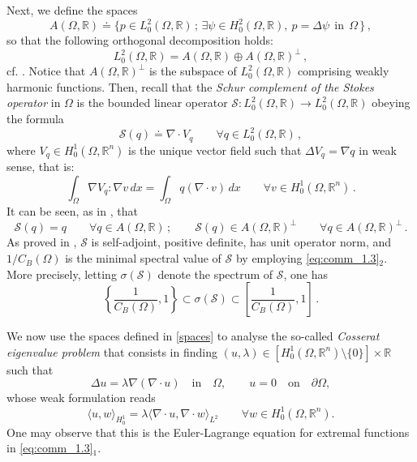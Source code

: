 \documentclass[11pt]{article}
\theoremstyle{plain}
\theoremstyle{definition}
\numberwithin{equation}{section}
\newcommand{\R}{\mathbb{R}}
\begin{document}
Next, we define the spaces
$$
A(\Omega,\R) \doteq \{ p \in L_{0}^{2}(\Omega,\R) \, ;\, \exists \psi \in H_{0}^{2}(\Omega,\R), \ p = \Delta \psi \ \ \text{in} \ \ \Omega \, \} \, ,
$$
so that the following orthogonal decomposition holds:
\begin{equation} \label{decompl02}
L_{0}^{2}(\Omega,\R) = A(\Omega,\R) \oplus A(\Omega,\R)^{\perp} \, ,
\end{equation}
cf. \cite[Section 2]{Crouzeix_1997}. Notice that $A(\Omega,\R)^{\perp}$ is the subspace of $L_{0}^{2}(\Omega,\R)$ comprising weakly harmonic functions. Then, recall that the \textit{Schur complement of the Stokes operator} in $\Omega$ is the bounded linear
operator $\mathcal{S} : L_{0}^{2}(\Omega,\R) \longrightarrow L_{0}^{2}(\Omega,\R)$ obeying the formula
\begin{equation}\label{Schur_complement}
\mathcal{S}(q) \doteq \nabla \cdot V_{q} \qquad \forall q \in L_{0}^{2}(\Omega,\R) \, ,
\end{equation}
where $V_{q} \in H_{0}^{1}(\Omega,\R^n)$ is the unique vector field such that $\Delta V_{q} = \nabla q$ in weak sense, that is:
\begin{equation}\label{qVq}
\int_{\Omega} \nabla V_{q} : \nabla v \, dx = \int_{\Omega} q(\nabla \cdot v) \, dx \qquad \forall v \in H_{0}^{1}(\Omega,\R^{n}) \, .
\end{equation}
It can be seen, as in \cite[Theorem 11.1]{weyers2006q}, that
\begin{equation} \label{sondecomp}
\mathcal{S}(q) = q \qquad \forall q \in A(\Omega,\R) \, ; \qquad \mathcal{S}(q) \in A(\Omega,\R)^{\perp} \qquad \forall q \in A(\Omega,\R)^{\perp} \, .
\end{equation}
As proved in \cite[Theorem 1]{gaultier1996spectral}, $\mathcal{S}$ is self-adjoint, positive definite, has unit operator norm, and $1/C_{B}(\Omega)$ is the minimal spectral value of $\mathcal{S}$ by employing \eqref{eq:comm_1.3}$_2$.
More precisely, letting $\sigma(\mathcal{S})$ denote the spectrum of $\mathcal{S}$, one has
\begin{equation} \label{spectrum1}
\left\{ \dfrac{1}{C_{B}(\Omega)},1 \right\} \subset \sigma(\mathcal{S}) \subset \left[ \dfrac{1}{C_{B}(\Omega)},1 \right] \, .
\end{equation}

We now use the spaces defined in \eqref{spaces} to analyse
the so-called {\em Cosserat eigenvalue problem} that consists in finding $(u,\lambda)\in [H^1_{0}(\Omega,\R^n)\setminus \{0\}]\times\R$ such that
$$
\Delta u=\lambda \nabla (\nabla \cdot u)\quad \mbox{in}\quad \Omega,\qquad u=0\quad \mbox{on}\quad \partial\Omega,
$$
whose weak formulation reads
\begin{equation}\label{eq:comm_1.5}
\langle  u,w\rangle_{H^1_0} =\lambda \langle \nabla\cdot u,\nabla \cdot w \rangle_{L^2}\qquad \forall w\in  H^1_{0}(\Omega,\R^n).
\end{equation}
One may observe that this is the Euler-Lagrange equation for extremal functions in \eqref{eq:comm_1.3}$_1$.
\end{document}
